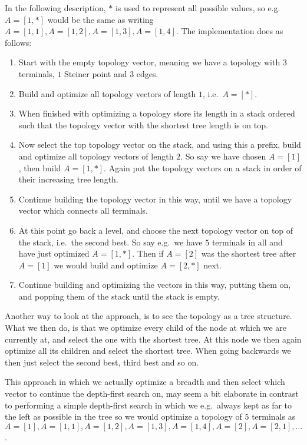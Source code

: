 In the following description, $\ast$ is used to represent all possible values,
so e.g.\ $A = [1, \ast]$ would be the same as writing $A = [1, 1], A = [1, 2], A =
[1,3], A = [1, 4]$. The implementation does as follows:
%
\begin{enumerate}
\item Start with the empty topology vector, meaning we have a topology with $3$
  terminals, $1$ Steiner point and $3$ edges.
\item Build and optimize all topology vectors of length $1$, i.e.\ $A = [\ast]$.
\item When finished with optimizing a topology store its length in a stack
  ordered such that the topology vector with the shortest tree length is on top.
\item Now select the top topology vector on the stack, and using this a prefix,
  build and optimize all topology vectors of length $2$. So say we have chosen $A = [1]$,
  then build $A = [1, \ast]$. Again put the
  topology vectors on a stack in order of their increasing tree length.
\item Continue building the topology vector in this way, until we have a
  topology vector which connects all terminals.
\item At this point go back a level, and choose the next topology vector on top
  of the stack, i.e.\ the second best. So say e.g.\ we have $5$ terminals in all
  and have just optimized $A = [1, \ast]$. Then if $A = [2]$ was the shortest tree
  after $A = [1]$ we would build and optimize $A = [2, \ast]$ next.
\item Continue building and optimizing the vectors in this way, putting them on,
  and popping them of the stack until the stack is empty.
\end{enumerate}
%
Another way to look at the approach, is to see the topology as a tree
structure. What we then do, is that we optimize every child of the node at which
we are currently at, and select the one with the shortest tree. At this node we
then again optimize all its children and select the shortest tree. When going
backwards we then just select the second best, third best and so on.

This approach in which we actually optimize a breadth and then select which
vector to continue the depth-first search on, may seem a bit elaborate in
contrast to performing a simple depth-first search in which we e.g.\ always kept
as far to the left as possible in the tree so we would optimize a topology of
$5$ terminals as $A = [1], A = [1,1], A = [1,2], A = [1,3], A = [1,4], A = [2],
A = [2,1], \ldots$.

